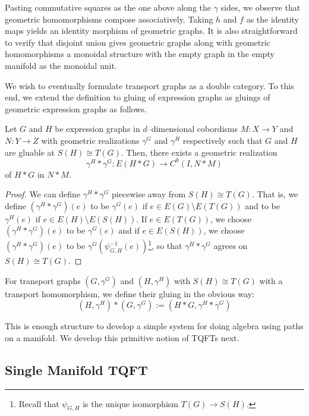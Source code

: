 \documentclass[./Thick_TQFTs_and_Quantum_Information.tex]{subfiles}
\begin{document}
Pasting commutative squares as the one above along the $\gamma$ sides, we
observe that geometric homomorphisms compose associatively. Taking
$h$ and $f$ as the identity maps yields an identity morphism of geometric
graphs. It is also straightforward to verify that disjoint union gives
geometric graphs along with geometric homomorphisms a monoidal structure with
the empty graph in the empty manifold as the monoidal unit.

We wish to eventually formulate transport graphs as a double category. To this
end, we extend the definition to gluing of expression graphs as gluings of
geometric expression graphs as follows.

\begin{lem}
Let $G$ and $H$ be expression graphs in $d$--dimensional cobordisms
$M : X \to Y$ and $N : Y \to Z$ with geometric realizations $\gamma^G$ and
$\gamma^H$ respectively such that $G$ and $H$ are gluable at $S(H) \cong T(G)$.
Then, there exists a geometric realization
\[
  \gamma^H * \gamma^G : E(H * G) \to C^0(I, N * M)
\]
of $H * G$ in $N * M$.
\end{lem}
\begin{proof}
We can define $\gamma^H * \gamma^G$ piecewise away from $S(H) \cong T(G)$. That
is, we define $(\gamma^H * \gamma^G)(e)$ to be
$\gamma^G(e)$ if $e \in E(G) \setminus E(T(G))$ and to be
$\gamma^H(e)$ if $e \in E(H) \setminus E(S(H))$.
If $e \in E(T(G))$, we choose $(\gamma^H * \gamma^G)(e)$ to be $\gamma^G(e)$ and
if $e \in E(S(H))$, we choose $(\gamma^H * \gamma^G)(e)$ to be
$\gamma^G(\psi_{G, H}^{-1}(e))$\footnote{Recall that $\psi_{G, H}$ is the unique
isomorphism $T(G) \to S(H)$.}, so that $\gamma^H * \gamma^G$ agrees on
$S(H) \cong T(G)$.
\end{proof}

\begin{defn}
For transport graphs $(G, \gamma^G)$ and $(H, \gamma^H)$ with $S(H) \cong T(G)$
with a transport homomorphism, we define their gluing in the obvious way:
\[
  (H, \gamma^H) * (G, \gamma^G) := (H * G, \gamma^H * \gamma^G)
\]
\end{defn}

This is enough structure to develop a simple system for doing algebra using
paths on a manifold. We develop this primitive notion of TQFTs next. 

\subsection{Single Manifold TQFT}
\end{document}
